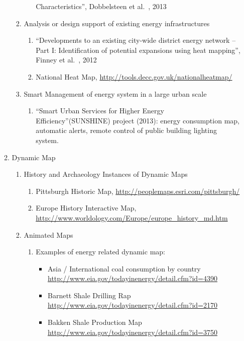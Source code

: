 \documentclass[12pt]{article}
\begin{document}
\begin{enumerate}
\begin{enumerate}[label*=\arabic*.]
\begin{enumerate}[label*=\arabic*.]
\begin{enumerate}[label*=\arabic*.]
        Characteristics'', Dobbelsteen et al.\ , 2013
      \end{enumerate}
    \item Analysis or design support of existing energy infrastructures
      \begin{enumerate}[label*=\arabic*.]
      \item ``Developments to an existing city-wide district energy
        network – Part I: Identification of potential expansions using
        heat mapping'', Finney et al.\ , 2012
      \item National Heat Map, \url{http://tools.decc.gov.uk/nationalheatmap/}
      \end{enumerate}
    \item Smart Management of energy system in a large urban scale
      \begin{enumerate}[label*=\arabic*.]
      \item ``Smart Urban Services for Higher Energy
        Efficiency''(SUNSHINE) project (2013): energy consumption map,
        automatic alerts, remote control of public building lighting
        system.
      \end{enumerate}
    \end{enumerate}
  \item Dynamic Map
    \begin{enumerate}[label*=\arabic*.]
    \item History and Archaeology Instances of Dynamic Maps
      \begin{enumerate}[label*=\arabic*.]
      \item Pittsburgh Historic Map, \url{http://peoplemaps.esri.com/pittsburgh/} 
      \item Europe History Interactive Map, \url{http://www.worldology.com/Europe/europe\_history\_md.htm}
      \end{enumerate}
    \item Animated Maps
      \begin{enumerate}[label*=\arabic*.]
      \item Examples of energy related dynamic map:
        \begin{itemize}
        \item Asia / International coal consumption by country \url{http://www.eia.gov/todayinenergy/detail.cfm?id=4390}
        \item Barnett Shale Drilling Rap \url{http://www.eia.gov/todayinenergy/detail.cfm?id=2170}
        \item Bakken Shale Production Map \url{http://www.eia.gov/todayinenergy/detail.cfm?id=3750}

\end{itemize}
\end{enumerate}
\end{enumerate}
\end{enumerate}
\end{enumerate}
\end{document}
